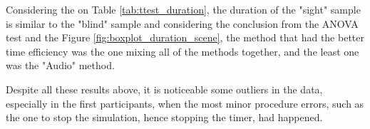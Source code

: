 Considering the on Table \ref{tab:ttest_duration}, the duration of the "sight" sample is similar to the "blind" sample and considering the conclusion from the ANOVA test and the Figure \ref{fig:boxplot_duration_scene}, the method that had the better time efficiency was the one mixing all of the methods together, and the least one was the "Audio" method.

Despite all these results above, it is noticeable some outliers in the data, especially in the first participants, when the most minor procedure errors, such as the one to stop the simulation, hence stopping the timer, had happened.


